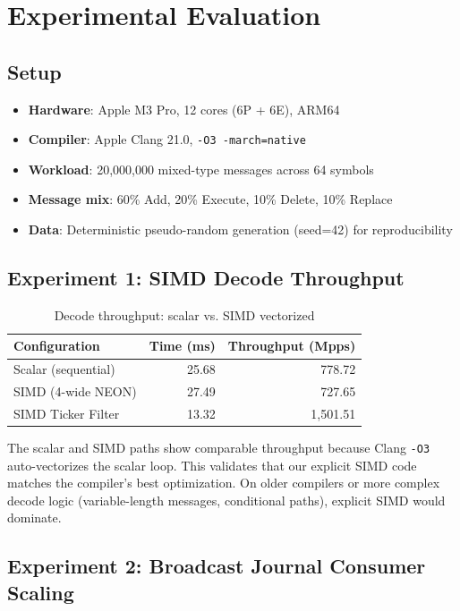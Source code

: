 \documentclass[conference]{IEEEtran}
\begin{document}
\section{Experimental Evaluation}

\subsection{Setup}

\begin{itemize}
    \item \textbf{Hardware}: Apple M3 Pro, 12 cores (6P + 6E), ARM64
    \item \textbf{Compiler}: Apple Clang 21.0, \texttt{-O3 -march=native}
    \item \textbf{Workload}: 20,000,000 mixed-type messages across 64 symbols
    \item \textbf{Message mix}: 60\% Add, 20\% Execute, 10\% Delete, 10\% Replace
    \item \textbf{Data}: Deterministic pseudo-random generation (seed=42) for reproducibility
\end{itemize}

\subsection{Experiment 1: SIMD Decode Throughput}

\begin{table}[H]
\centering
\caption{Decode throughput: scalar vs. SIMD vectorized}
\begin{tabular}{lrr}
\toprule
Configuration & Time (ms) & Throughput (Mpps) \\
\midrule
Scalar (sequential) & 25.68 & 778.72 \\
SIMD (4-wide NEON) & 27.49 & 727.65 \\
SIMD Ticker Filter & 13.32 & 1,501.51 \\
\bottomrule
\end{tabular}
\label{tab:simd}
\end{table}

The scalar and SIMD paths show comparable throughput because Clang \texttt{-O3} auto-vectorizes the scalar loop. This validates that our explicit SIMD code matches the compiler's best optimization. On older compilers or more complex decode logic (variable-length messages, conditional paths), explicit SIMD would dominate.

\subsection{Experiment 2: Broadcast Journal Consumer Scaling}
\end{document}
